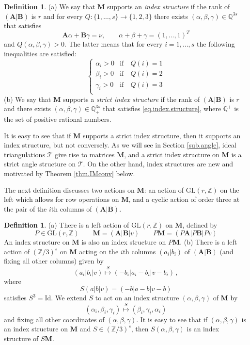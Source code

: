 \documentclass[12pt]{amsart}
\theoremstyle{definition}
\newtheorem{definition}[theorem]{Definition}
\def\BZ{\mathbb Z}
\def\BQ{\mathbb Q}
\def\calT{\mathcal T}
\def\a{\alpha}
\def\ga{\gamma}
\def\b{\beta}
\def\be{  \begin{equation} }
\def\ee{  \end{equation} }
\def\GL{\mathrm{GL}}
\newcommand{\mb}{\mathbf}
\numberwithin{equation}{section}
\begin{document}
\begin{definition}
\label{def.strictindex}
\rm{(a)} We say that $\mb M$ supports an {\em index structure} if the rank 
of $(\mb A | \mb B)$ is $r$ and for every $Q: \{1,\dots,s\}\to\{1,2,3\}$
there exists $(\a,\b,\ga) \in \BQ^{3s}$ that satisfies
\be
\label{eq.index.structure}
\mb A \a + \mb B \ga = \nu, \qquad
\a+\b+\ga=(1,\dots,1)^T
\ee
and $Q(\a,\b,\ga) >0$. The latter means that for every $i=1,\dots,s$
the following inequalities are satisfied:
\be
\label{eq.index.ineq}
\begin{cases}
\a_i > 0 & \text{if} \quad Q(i)=1 \\
\b_i > 0 & \text{if} \quad Q(i)=2 \\
\ga_i > 0 & \text{if} \quad Q(i)=3 \\
\end{cases}
\ee
\rm{(b)} We say that $\mb M$ supports a {\em strict index structure} 
if the rank of $(\mb A | \mb B)$ is $r$ and there exists $(\a,\b,\ga) \in
\BQ_+^{3s}$ that satisfies \eqref{eq.index.structure}, where $\BQ^+$ is the
set of positive rational numbers.
\end{definition}  
It is easy to see that if $\mb M$ supports a strict index structure, then
it supports an index structure, but not conversely. As we will see in Section
\ref{sub.angle}, ideal triangulations $\calT$ give rise to matrices $\mb M$,
and a strict index structure on $\mb M$ is a strict angle structure on $\calT$.
On the other hand, index structures are new and motivated by Theorem 
\ref{thm.IMconv} below.

The next definition discusses two actions on $\mb M$: an action of $\GL(r,\BZ)$
on the left which allows for row operations on $\mb M$, and a cyclic action
of order three at the pair of the $i$th columns of $(\mb A|\mb B)$. 

\begin{definition}
\label{def.GLr}
\rm{(a)}
There is a left action of $\GL(r,\BZ)$ on $\mb M$, defined by
$$
P  \in \GL(r,\BZ) \qquad \mb M=(\mb A|\mb B|v)
\qquad P \mb{M}=(P \mb A|P \mb B|P v)
$$ 
An index structure on $\mb M$ is also an
index structure on $P \mb M$.
\newline
\rm{(b)} There is a left action of $(\BZ/3)^s$ on $\mb M$ acting
on the $i$th columns $(a_i|b_i)$ of $(\mb A|\mb B)$ (and fixing
all other columns) given by
\be
\label{eq.Z3M}
(a_i|b_i|v) \overset{S}{\mapsto} (-b_i | a_i -b_i|v-b_i)\,,
\ee
where 
\be
\label{eq.defS}
S(a|b|v)=(-b|a-b|v-b)
\ee
satisfies $S^3=\mathrm{Id}$. We extend $S$ to act on an index structure
$(\a,\b,\ga)$ of $\mb M$ by 
\be
\label{eq.Z3angle}
(\a_i,\b_i,\ga_i) \overset{S}{\mapsto} (\b_i,\ga_i,\a_i)
\ee
and fixing all other coordinates of $(\a,\b,\ga)$. It is easy to see that 
if $(\a,\b,\ga)$ is an index structure on $\mb M$ and $S \in (\BZ/3)^s$,
then $S(\a,\b,\ga)$ is an index structure of $S \mb M$.
\end{definition}
\end{document}
